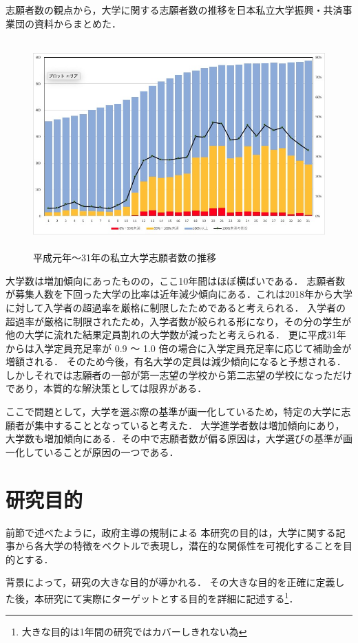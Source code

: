 志願者数の観点から，大学に関する志願者数の推移を日本私立大学振興・共済事業団の資料\cite{shigan}からまとめた．
\begin{figure}[H]
\centering
\includegraphics[height=8cm]{images/shigansya.jpg}
\caption{平成元年〜31年の私立大学志願者数の推移}
\label{fig:shigan}
\end{figure}
大学数は増加傾向にあったものの，ここ10年間はほぼ横ばいである．
志願者数が募集人数を下回った大学の比率は近年減少傾向にある．これは2018年から大学に対して入学者の超過率を厳格に制限\cite{hojokin1}したためであると考えられる．
入学者の超過率が厳格に制限されたため，入学者数が絞られる形になり，その分の学生が他の大学に流れた結果定員割れの大学数が減ったと考えられる．
更に平成31年からは入学定員充足率が 0.9 〜 1.0 倍の場合に入学定員充足率に応じて補助金が増額される．\cite{hojokin2}
そのため今後，有名大学の定員は減少傾向になると予想される．
しかしそれでは志願者の一部が第一志望の学校から第二志望の学校になっただけであり，本質的な解決策としては限界がある．

ここで問題として，大学を選ぶ際の基準が画一化しているため，特定の大学に志願者が集中することとなっていると考えた．
大学進学者数は増加傾向にあり，大学数も増加傾向にある．その中で志願者数が偏る原因は，大学選びの基準が画一化していることが原因の一つである．


\section{研究目的}
前節で述べたように，政府主導の規制による
本研究の目的は，大学に関する記事から各大学の特徴をベクトルで表現し，潜在的な関係性を可視化することを目的とする．

背景によって，研究の大きな目的が導かれる．
その大きな目的を正確に定義した後，本研究にて実際にターゲットとする目的を詳細に記述する\footnote{大きな目的は1年間の研究ではカバーしきれない為}．

